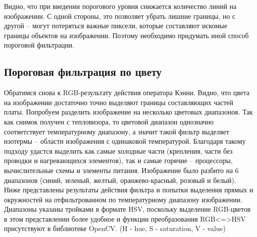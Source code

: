 



Видно, что при введении порогового уровня снижается количество линий на изображении. С одной стороны, это позволяет убрать лишние границы, но с другой -- могут потеряться важные пиксели, которые составляют искомые границы объектов на изображении. Поэтому необходимо придумать иной способ пороговой фильтрации.
\newline

\subsection{Пороговая фильтрация по цвету}
Обратимся снова к RGB-результату действия оператора Кэнни. Видно, что цвета на изображении достаточно точно выделяют границы составляющих частей платы. 
\newline 
Попробуем разделить изображение на несколько цветовых диапазонов. Так как снимок получен с тепловизора, то цветовой диапазон однозначно соответствует температурному диапазону, а значит такой фильтр выделяет изотермы -- области изображения с одинаковой температурой. Благодаря такому подходу удастся выделить как самые холодные части (крепления, части без проводки и нагревающихся элементов), так и самые горячие -- процессоры, вычислительные схемы и элементы питания. 
\newline
Изображение было разбито на 6 диапазонов (синий, зеленый, желтый, оранжево-красный, розовый и белый). Ниже представлены результаты действия фильтра и попытки выделения прямых и окружностей на отфильтрованном по температурному диапазону изображении. Диапазоны указаны тройками в формате HSV, поскольку выделение RGB-цветов в этом представлении более удобное и функции преобразования RGB<=>HSV присутствуют в библиотеке OpenCV. (H - hue, S - saturation, V - value)
\newline



